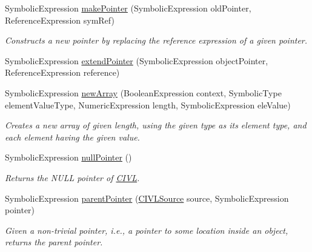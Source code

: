 \begin{DoxyCompactItemize}
Symbolic\+Expression \hyperlink{classedu_1_1udel_1_1cis_1_1vsl_1_1civl_1_1dynamic_1_1common_1_1CommonSymbolicUtility_af144a65fabd18fb62a51cda316573cf8}{make\+Pointer} (Symbolic\+Expression old\+Pointer, Reference\+Expression sym\+Ref)
\begin{DoxyCompactList}\small\item\em Constructs a new pointer by replacing the reference expression of a given pointer. \end{DoxyCompactList}\item 
Symbolic\+Expression \hyperlink{classedu_1_1udel_1_1cis_1_1vsl_1_1civl_1_1dynamic_1_1common_1_1CommonSymbolicUtility_a8855f7fe8b25a7289d27ef8be8247363}{extend\+Pointer} (Symbolic\+Expression object\+Pointer, Reference\+Expression reference)
\item 
Symbolic\+Expression \hyperlink{classedu_1_1udel_1_1cis_1_1vsl_1_1civl_1_1dynamic_1_1common_1_1CommonSymbolicUtility_ad90018076e79122b424cff0173178edc}{new\+Array} (Boolean\+Expression context, Symbolic\+Type element\+Value\+Type, Numeric\+Expression length, Symbolic\+Expression ele\+Value)
\begin{DoxyCompactList}\small\item\em Creates a new array of given length, using the given type as its element type, and each element having the given value. \end{DoxyCompactList}\item 
Symbolic\+Expression \hyperlink{classedu_1_1udel_1_1cis_1_1vsl_1_1civl_1_1dynamic_1_1common_1_1CommonSymbolicUtility_a1458809869499edbfca1ea4dac7d37a1}{null\+Pointer} ()
\begin{DoxyCompactList}\small\item\em Returns the N\+U\+L\+L pointer of \hyperlink{classedu_1_1udel_1_1cis_1_1vsl_1_1civl_1_1CIVL}{C\+I\+V\+L}. \end{DoxyCompactList}\item 
Symbolic\+Expression \hyperlink{classedu_1_1udel_1_1cis_1_1vsl_1_1civl_1_1dynamic_1_1common_1_1CommonSymbolicUtility_a00389b2e83ef53fd8693acc9f3fd0d42}{parent\+Pointer} (\hyperlink{interfaceedu_1_1udel_1_1cis_1_1vsl_1_1civl_1_1model_1_1IF_1_1CIVLSource}{C\+I\+V\+L\+Source} source, Symbolic\+Expression pointer)
\begin{DoxyCompactList}\small\item\em Given a non-\/trivial pointer, i.\+e., a pointer to some location inside an object, returns the parent pointer. \end{DoxyCompactList}\item 

\end{DoxyCompactItemize}
